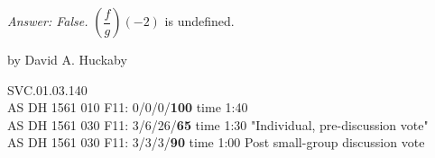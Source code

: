 	
 \emph{Answer: False.}  $\left ( \dfrac{f}{g} \right ) (-2)$ is undefined.
  
	by David A. Huckaby

SVC.01.03.140 \\
AS DH 1561 010 F11: 0/0/0/{\bf100} time 1:40  \\
AS DH 1561 030 F11: 3/6/26/{\bf65} time 1:30 "Individual, pre-discussion vote" \\
AS DH 1561 030 F11: 3/3/3/{\bf90} time 1:00 Post small-group discussion vote \\
